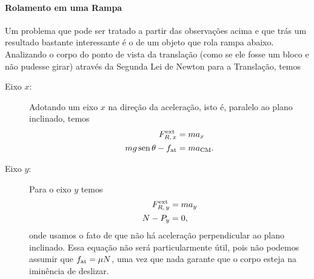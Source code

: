 \paragraph{Rolamento em uma Rampa}

Um problema que pode ser tratado a partir das observações acima e que trás um resultado bastante interessante é o de um objeto que rola rampa abaixo. Analizando o corpo do ponto de vista da translação (como se ele fosse um bloco e não pudesse girar) através da Segunda Lei de Newton para a Translação, temos
\begin{description}
    \item[Eixo $x$:] Adotando um eixo $x$ na direção da aceleração, isto é, paralelo ao plano inclinado, temos
    \begin{align}
        F_{R,\,x}^{\rm{ext}} &= ma_x \\
        mg \operatorname{sen}\theta - f_{\rm{at}} &= m a_{\textrm{CM}}.
    \end{align}

    \item[Eixo $y$:] Para o eixo $y$ temos
    \begin{align}
        F_{R,\,y}^{\rm{ext}} &= m a_y \\
        N - P_y &= 0,
    \end{align}
    onde usamos o fato de que não há aceleração perpendicular ao plano inclinado. Essa equação não será particularmente útil, pois não podemos assumir que $f_{\rm{at}} = \mu N$, uma vez que nada garante que o corpo esteja na iminência de deslizar.
\end{description}

